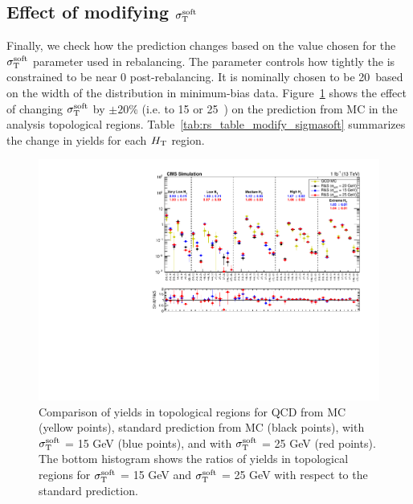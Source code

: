 \subsection{Effect of modifying $\sigma_{\mathrm{T}}^{\mathrm{soft}}$}
\label{sec:rs_sigmasoft}

Finally, we check how the \rs prediction changes based on the value chosen for the $\sigma_{\mathrm{T}}^{\mathrm{soft}}$ parameter used in rebalancing.
The parameter controls how tightly the \vMet is constrained to be near 0 post-rebalancing.
It is nominally chosen to be 20~\GeV based on the width of the \ptmiss distribution in minimum-bias data. 
Figure~\ref{Fig:rs_modify_sigmasoft} shows the effect of changing $\sigma_{\mathrm{T}}^{\mathrm{soft}}$ by $\pm20$\% (i.e. to 15 or 25~\GeV)
on the \rs prediction from MC in the analysis topological regions.
Table~\ref{tab:rs_table_modify_sigmasoft} summarizes the change in yields for each $H_{\mathrm{T}}$ region.

\begin{figure}[ht]
  \begin{center}
    \includegraphics[width=1.0\textwidth]{figs/qcd/rs_mc/mc_sigmasoft.pdf}
    \caption{Comparison of yields in topological regions for QCD from MC (yellow points), standard \rs prediction from MC (black points), \rs with $\sigma_{\mathrm{T}}^{\mathrm{soft}}$ = 15 GeV (blue points), and
             \rs with $\sigma_{\mathrm{T}}^{\mathrm{soft}}$ = 25 GeV (red points). The bottom histogram shows the ratios of yields in topological regions for $\sigma_{\mathrm{T}}^{\mathrm{soft}}$ = 15 GeV and
             $\sigma_{\mathrm{T}}^{\mathrm{soft}}$ = 25 GeV with respect to the standard \rs prediction.
            }
    \label{Fig:rs_modify_sigmasoft}
  \end{center}
\end{figure}

